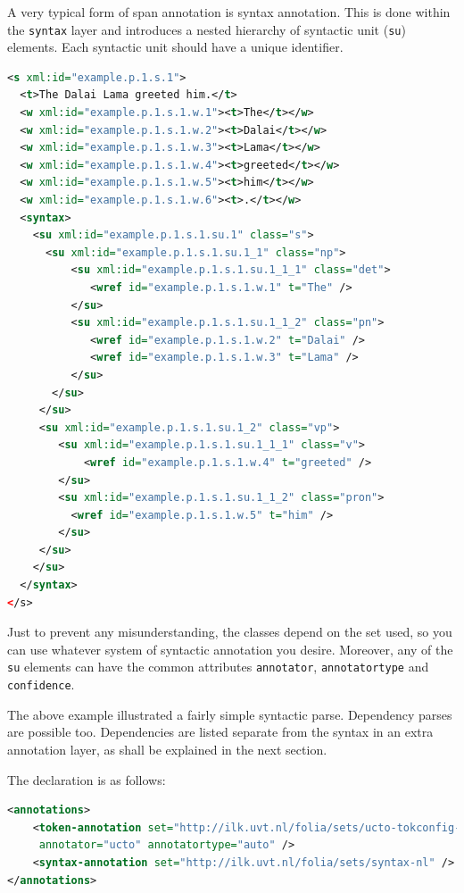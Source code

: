 \documentclass[a4paper,12pt]{report}
\begin{document}
A very typical form of span annotation is syntax annotation. This is done within the \texttt{syntax} layer and introduces a nested hierarchy of syntactic unit (\texttt{su}) elements. Each syntactic unit should have a unique identifier.

\begin{lstlisting}[language=xml]
<s xml:id="example.p.1.s.1">
  <t>The Dalai Lama greeted him.</t>
  <w xml:id="example.p.1.s.1.w.1"><t>The</t></w>
  <w xml:id="example.p.1.s.1.w.2"><t>Dalai</t></w>
  <w xml:id="example.p.1.s.1.w.3"><t>Lama</t></w>
  <w xml:id="example.p.1.s.1.w.4"><t>greeted</t></w>
  <w xml:id="example.p.1.s.1.w.5"><t>him</t></w>
  <w xml:id="example.p.1.s.1.w.6"><t>.</t></w>
  <syntax>
    <su xml:id="example.p.1.s.1.su.1" class="s">     
      <su xml:id="example.p.1.s.1.su.1_1" class="np">
          <su xml:id="example.p.1.s.1.su.1_1_1" class="det">
             <wref id="example.p.1.s.1.w.1" t="The" />       
          </su>
          <su xml:id="example.p.1.s.1.su.1_1_2" class="pn">
             <wref id="example.p.1.s.1.w.2" t="Dalai" />
             <wref id="example.p.1.s.1.w.3" t="Lama" />        
          </su>         
       </su>
     </su>
     <su xml:id="example.p.1.s.1.su.1_2" class="vp"> 
        <su xml:id="example.p.1.s.1.su.1_1_1" class="v">
            <wref id="example.p.1.s.1.w.4" t="greeted" />       
        </su>
        <su xml:id="example.p.1.s.1.su.1_1_2" class="pron">
          <wref id="example.p.1.s.1.w.5" t="him" />       
        </su>
     </su>    
    </su>
  </syntax>
</s>
\end{lstlisting}

Just to prevent any misunderstanding, the classes depend on the set used, so you can use whatever system of syntactic annotation you desire. Moreover, any of the \texttt{su} elements can have the common attributes \texttt{annotator}, \texttt{annotatortype} and \texttt{confidence}.


The above example illustrated a fairly simple syntactic parse. Dependency parses are possible too. Dependencies are listed separate from the syntax in an extra annotation layer, as shall be explained in the next section.

The declaration is as follows:

\begin{lstlisting}[language=xml]
<annotations>
    <token-annotation set="http://ilk.uvt.nl/folia/sets/ucto-tokconfig-nl" 
     annotator="ucto" annotatortype="auto" />
    <syntax-annotation set="http://ilk.uvt.nl/folia/sets/syntax-nl" />
</annotations>
\end{lstlisting}
\end{document}
